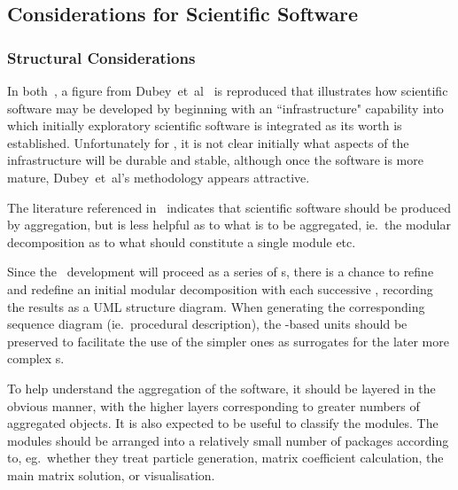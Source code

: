 \subsection{Considerations for Scientific Software}\label{sec:TS_scistruct}
\subsubsection{Structural Considerations}\label{sec:TS_structure}
In both~\cite{y1re331,y2re332}, a figure from Dubey~et~al~\cite{Du16Idea} is reproduced
that illustrates how scientific software may be developed by beginning with an ``infrastructure"
capability into which initially exploratory scientific software is integrated as its worth
is established. Unfortunately for \nep, it is not clear initially what  aspects  of the infrastructure
will be durable and stable, although once the software is more mature, Dubey~et~al's methodology
appears attractive.

The literature referenced in~\cite{y2re333}
indicates that scientific software should be produced by aggregation, but is less
helpful as to what is to be aggregated, ie.\  the modular decomposition as to what should
constitute a single module etc.

Since the \nep\ development will proceed as a series of \papp s, there is a chance
to refine and redefine an initial modular decomposition with each successive \papp,
recording the results as a UML structure diagram. When generating the corresponding
sequence diagram (ie.\  procedural description), the \papp-based units should be preserved to
facilitate the use of the simpler ones as surrogates for the later more complex \papp s.

To help understand the  aggregation of the software, it should be layered in the obvious manner,
with the higher layers corresponding to greater numbers of aggregated objects. It is also expected
to be useful to classify the modules.
The modules should be arranged into a relatively small number of packages according to, 
eg.\ whether they treat particle generation, matrix coefficient calculation, the main matrix solution, or visualisation.
